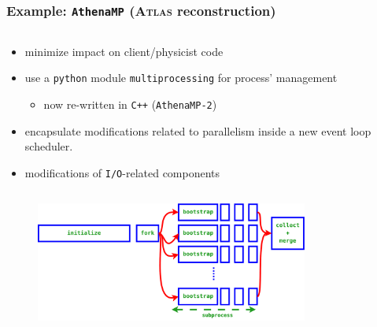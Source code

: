 \documentclass[9pt]{beamer}
\newcommand{\mygreen}[1] {{\color[rgb]{0,0.5,0}#1}}
\begin{document}
\begin{frame}
\frametitle{Example: \texttt{AthenaMP} (\textsc{Atlas} reconstruction)}

  \begin{columns}
    \begin{column}{0.95\textwidth}

      \begin{block}{}
        \begin{itemize}
          \item minimize impact on client/physicist code
          \item use a \texttt{python} module \mygreen{\texttt{multiprocessing}} for process' management
          \begin{itemize}
            \item now re-written in \texttt{C++} (\texttt{AthenaMP-2})
          \end{itemize}
        \item encapsulate modifications related to parallelism inside a new event loop scheduler.
        \item modifications of \texttt{I/O}-related components
        \end{itemize}
      \end{block}

    \end{column}
  \end{columns}

  \begin{figure}
    \begin{center}
      \includegraphics[angle=0,width=0.8\textwidth]{figs/athenamp-sequence.pdf}
    \end{center}
  \end{figure}
\end{frame}
\end{document}
